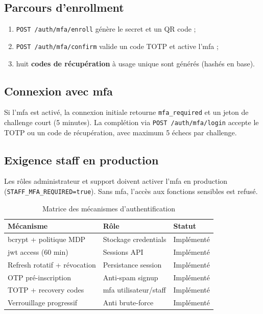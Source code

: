\subsection{Parcours d'enrollment}

\begin{enumerate}
  \item \texttt{POST /auth/mfa/enroll} génère le secret et un QR code ;
  \item \texttt{POST /auth/mfa/confirm} valide un code TOTP et active l'\gls{mfa} ;
  \item huit \textbf{codes de récupération} à usage unique sont générés (hashés en base).
\end{enumerate}

\subsection{Connexion avec \gls{mfa}}

Si l'\gls{mfa} est activé, la connexion initiale retourne \texttt{mfa\_required} et un jeton de challenge court (5 minutes). La complétion via \texttt{POST /auth/mfa/login} accepte le TOTP ou un code de récupération, avec maximum 5 échecs par challenge.

\subsection{Exigence staff en production}

Les rôles administrateur et support doivent activer l'\gls{mfa} en production (\texttt{STAFF\_MFA\_REQUIRED=true}). Sans \gls{mfa}, l'accès aux fonctions sensibles est refusé.

\begin{table}[H]
  \centering
  \caption{Matrice des mécanismes d'authentification}
  \label{tab:auth-matrix}
  \begin{tabularx}{\textwidth}{@{}lXl@{}}
    \toprule
    \textbf{Mécanisme} & \textbf{Rôle} & \textbf{Statut} \\
    \midrule
    bcrypt + politique MDP & Stockage credentials & Implémenté \\
    \gls{jwt} access (60 min) & Sessions API & Implémenté \\
    Refresh rotatif + révocation & Persistance session & Implémenté \\
    OTP pré-inscription & Anti-spam signup & Implémenté \\
    TOTP + recovery codes & \gls{mfa} utilisateur/staff & Implémenté \\
    Verrouillage progressif & Anti brute-force & Implémenté \\
  \bottomrule
  \end{tabularx}
\end{table}

